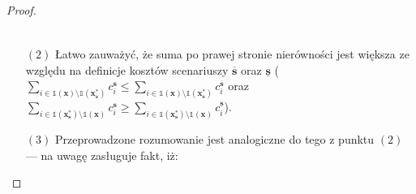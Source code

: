 \begin{proof}
\begin{itemize}
\begin{gather*}
		\end{gather*}
		\item[$\left( 2 \right)$] Łatwo zauważyć, że suma po prawej stronie nierówności jest większa ze względu na definicje kosztów scenariuszy $\overline{\textbf{s}}$ oraz $\underline{\textbf{s}}$ ($\sum_{i \in \mathbb{1} \left( \textbf{x} \right) \setminus \mathbb{1} \left( \textbf{x}^{\ast}_{\textbf{s}} \right)} c_{i}^{\textbf{s}} \leqslant \sum_{i \in \mathbb{1} \left( \textbf{x} \right) \setminus \mathbb{1} \left( \textbf{x}^{\ast}_{\textbf{s}} \right)} c_{i}^{\overline{\textbf{s}}}$ oraz $\sum_{i \in \mathbb{1} \left( \textbf{x}^{\ast}_{\textbf{s}} \right) \setminus \mathbb{1} \left( \textbf{x} \right)} c_{i}^{\textbf{s}} \geqslant \sum_{i \in \mathbb{1} \left( \textbf{x}^{\ast}_{\textbf{s}} \right) \setminus \mathbb{1} \left( \textbf{x} \right)} c_{i}^{\underline{\textbf{s}}}$). 
		\item[$\left( 3 \right)$] Przeprowadzone rozumowanie jest analogiczne do tego z punktu $\left( 2 \right)$ --- na uwagę zasługuje fakt, iż:
		

\end{itemize}
\end{proof}
